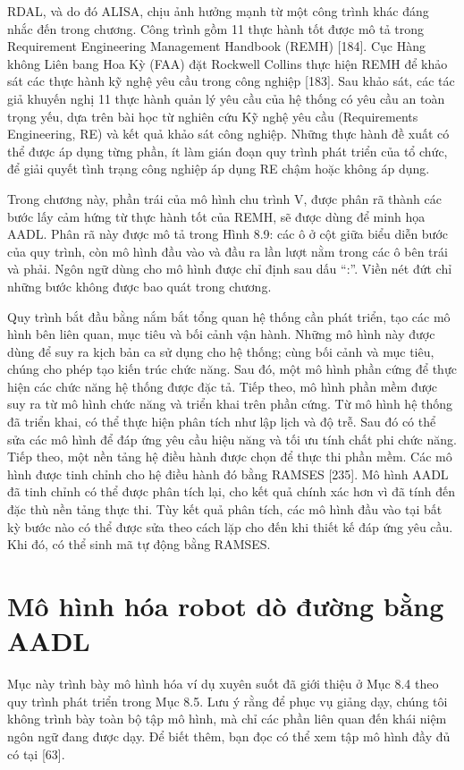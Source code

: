 RDAL, và do đó ALISA, chịu ảnh hưởng mạnh từ một công trình khác đáng nhắc đến trong chương. Công trình gồm 11 thực hành tốt được mô tả trong Requirement Engineering Management Handbook (REMH) [184]. Cục Hàng không Liên bang Hoa Kỳ (FAA) đặt Rockwell Collins thực hiện REMH để khảo sát các thực hành kỹ nghệ yêu cầu trong công nghiệp [183]. Sau khảo sát, các tác giả khuyến nghị 11 thực hành quản lý yêu cầu của hệ thống có yêu cầu an toàn trọng yếu, dựa trên bài học từ nghiên cứu Kỹ nghệ yêu cầu (Requirements Engineering, RE) và kết quả khảo sát công nghiệp. Những thực hành đề xuất có thể được áp dụng từng phần, ít làm gián đoạn quy trình phát triển của tổ chức, để giải quyết tình trạng công nghiệp áp dụng RE chậm hoặc không áp dụng.

Trong chương này, phần trái của mô hình chu trình V, được phân rã thành các bước lấy cảm hứng từ thực hành tốt của REMH, sẽ được dùng để minh họa AADL. Phân rã này được mô tả trong Hình 8.9: các ô ở cột giữa biểu diễn bước của quy trình, còn mô hình đầu vào và đầu ra lần lượt nằm trong các ô bên trái và phải. Ngôn ngữ dùng cho mô hình được chỉ định sau dấu ``:''. Viền nét đứt chỉ những bước không được bao quát trong chương.

Quy trình bắt đầu bằng nắm bắt tổng quan hệ thống cần phát triển, tạo các mô hình bên liên quan, mục tiêu và bối cảnh vận hành. Những mô hình này được dùng để suy ra kịch bản ca sử dụng cho hệ thống; cùng bối cảnh và mục tiêu, chúng cho phép tạo kiến trúc chức năng. Sau đó, một mô hình phần cứng để thực hiện các chức năng hệ thống được đặc tả. Tiếp theo, mô hình phần mềm được suy ra từ mô hình chức năng và triển khai trên phần cứng. Từ mô hình hệ thống đã triển khai, có thể thực hiện phân tích như lập lịch và độ trễ. Sau đó có thể sửa các mô hình để đáp ứng yêu cầu hiệu năng và tối ưu tính chất phi chức năng. Tiếp theo, một nền tảng hệ điều hành được chọn để thực thi phần mềm. Các mô hình được tinh chỉnh cho hệ điều hành đó bằng RAMSES [235]. Mô hình AADL đã tinh chỉnh có thể được phân tích lại, cho kết quả chính xác hơn vì đã tính đến đặc thù nền tảng thực thi. Tùy kết quả phân tích, các mô hình đầu vào tại bất kỳ bước nào có thể được sửa theo cách lặp cho đến khi thiết kế đáp ứng yêu cầu. Khi đó, có thể sinh mã tự động bằng RAMSES.

\section{Mô hình hóa robot dò đường bằng AADL}
Mục này trình bày mô hình hóa ví dụ xuyên suốt đã giới thiệu ở Mục 8.4 theo quy trình phát triển trong Mục 8.5. Lưu ý rằng để phục vụ giảng dạy, chúng tôi không trình bày toàn bộ tập mô hình, mà chỉ các phần liên quan đến khái niệm ngôn ngữ đang được dạy. Để biết thêm, bạn đọc có thể xem tập mô hình đầy đủ có tại [63].

